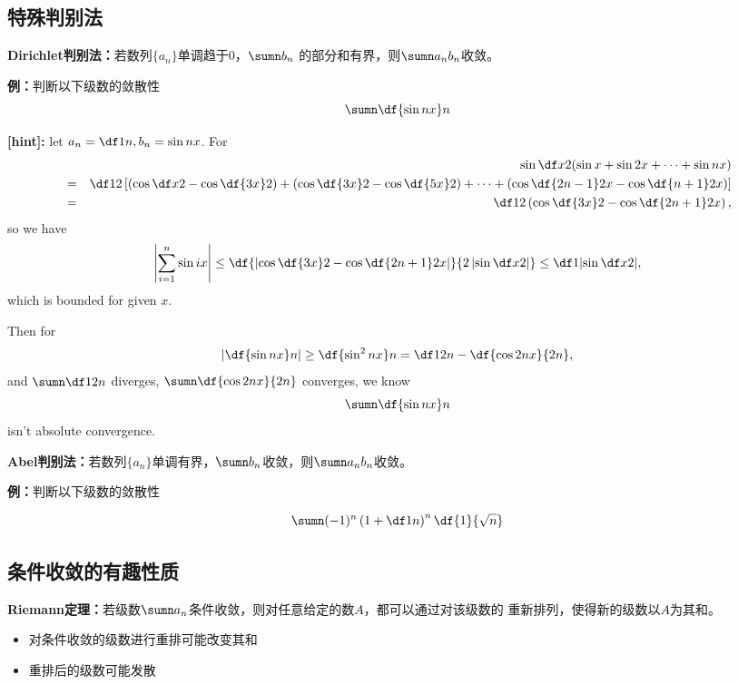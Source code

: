 \begin{shaded}

\subsection{特殊判别法}

{\bf Dirichlet判别法：}若数列$\{a_n\}$单调趋于$0$，$\sumn b_n$
  的部分和有界，则$\sumn a_nb_n$收敛。
  
{\bf 例：}判断以下级数的敛散性
$$\sumn\df{\sin nx}n$$

{\bf [hint]:}
let $a_n=\df1n,b_n=\sin nx$. For
\begin{eqnarray*}
&&\sin\df x2(\sin x+\sin2x+\cdots+\sin nx)\\
&=&\df12\left[\left(\cos\df x2-\cos\df{3x}2\right)+
\left(\cos\df {3x}2-\cos\df{5x}2\right)+\cdots+
\left(\cos\df {2n-1}2x-\cos\df{n+1}2x\right)\right]\\
&=&\df12\left(\cos\df{3x}2-\cos\df{2n+1}2x\right),
\end{eqnarray*}
so we have
$$\left|\sum\limits_{i=1}^n\sin ix\right|
\leq\df{\left|\cos\df{3x}2-\cos\df{2n+1}2x\right|}{2\left|\sin\df x2\right|}
\leq\df1{\left|\sin\df x2\right|},$$
which is bounded for given $x$.

Then for
$$\left|\df{\sin nx}n\right|\geq\df{\sin^2nx}n=\df1{2n}-\df{\cos2nx}{2n},$$
and $\sumn\df1{2n}$ diverges, $\sumn\df{\cos2nx}{2n}$ converges, we know
$$\sumn\df{\sin nx}n$$ isn't absolute convergence.

{\bf Abel判别法：}若数列$\{a_n\}$单调有界，$\sumn b_n$收敛，则$\sumn a_nb_n$收敛。

{\bf 例：}判断以下级数的敛散性

$$\sumn(-1)^n\left(1+\df 1n\right)^n\df{1}{\sqrt n}$$ 

\subsection{条件收敛的有趣性质}

{\bf Riemann定理：}若级数$\sumn a_n$条件收敛，则对任意给定的数$A$，都可以通过对该级数的
重新排列，使得新的级数以$A$为其和。

\begin{itemize}
  \item 对条件收敛的级数进行重排可能改变其和
  \item 重排后的级数可能发散
\end{itemize}

\end{shaded}

